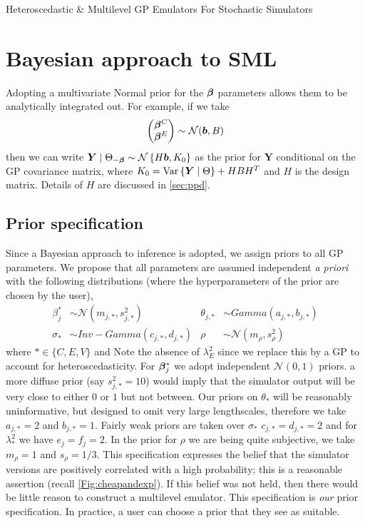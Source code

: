 \begin{chapter}{Heteroscedastic \& Multilevel GP Emulators For Stochastic Simulators\label{Ch:Hetsml}}
\section{Bayesian approach to SML}
Adopting a multivariate Normal prior for the $\bm{\beta}$ parameters allows them to be analytically integrated out. For example, if we take
\begin{equation*}
 \begin{pmatrix}
  \bm{\bm{\beta}}^C \\ \bm{\bm{\beta}}^E
 \end{pmatrix}\sim \mathcal{N}(\bm{b}, B)
\end{equation*}
then we can write $\bm{Y}\mid\Theta_{-\bm{\beta}}\sim\mathcal{N} \left\{ H\bm{b}, K_0 \right\}$ as the prior for $\bm{Y}$ conditional on the GP covariance matrix, where $K_0=\mathrm{Var}\,\{\bm{Y}\mid \Theta\} + HBH^T$ and $H$ is the design matrix. Details of $H$ are discussed in \cref{sec:ppd}.

\subsection{Prior specification}

Since a Bayesian approach to inference is adopted, we assign priors to all GP parameters. We propose that all parameters are assumed independent \textit{a priori} with the following distributions (where the hyperparameters of the prior are chosen by the user),
\begin{align}
\beta_{j}^{*} &\sim \mathcal{N}(m_{j,*}, s_{j,*}^2) & \theta_{j,*} &\sim Gamma(a_{j, *}, b_{j, *}) \\
\sigma_* &\sim Inv-Gamma(c_{j,*}, d_{j,*}) & \rho &\sim \mathcal{N}(m_{\rho}, s_{\rho}^2)
\end{align}
\noindent where $* \in \{ C, E, V \}$ and  Note the absence of $\lambda^2_{E}$ since we replace this by a GP to account for heteroscedasticity. For $\bm{\beta}^{*}_{j}$ we adopt independent $\mathcal{N}(0,1)$ priors.  a more diffuse prior (say $s_{j,*}^2=10$) would imply that the simulator output will be very close to either $0$ or $1$ but not between. Our priors on $\theta_{*}$ will be reasonably uninformative, but designed to omit very large lengthscales, therefore we take $a_{j,*} = 2$ and $b_{j,*} = 1$. Fairly weak priors are taken over $\sigma_*$ $c_{j,*}=d_{j,*}=2$ and for $\lambda^2_*$ we have $e_j = f_j=2$. In the prior for $\rho$ we are being quite subjective, we take $m_\rho = 1$ and $s_\rho = 1/3$. This specification expresses the belief that the simulator versions are positively correlated with a high probability; this is a reasonable assertion (recall \cref{Fig:cheapandexp}). If this belief was not held, then there would be little reason to construct a multilevel emulator. This specification is \textit{our} prior specification. In practice, a user can choose a prior that they see as suitable.

\end{chapter}
